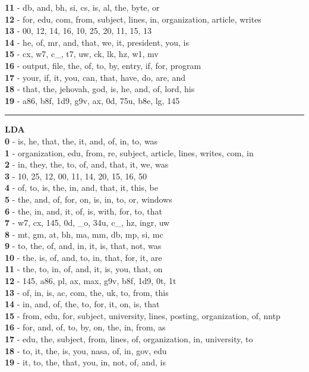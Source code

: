 \textbf{11} - db, and, bh, si, cs, is, al, the, byte, or\\
\textbf{12} - for, edu, com, from, subject, lines, in, organization, article, writes\\
\textbf{13} - 00, 12, 14, 16, 10, 25, 20, 11, 15, 13\\
\textbf{14} - he, of, mr, and, that, we, it, president, you, is\\
\textbf{15} - cx, w7, c\_, t7, uw, ck, lk, hz, w1, mv\\
\textbf{16} - output, file, the, of, to, by, entry, if, for, program\\
\textbf{17} - your, if, it, you, can, that, have, do, are, and\\
\textbf{18} - that, the, jehovah, god, is, he, and, of, lord, his\\
\textbf{19} - a86, b8f, 1d9, g9v, ax, 0d, 75u, b8e, lg, 145\\
\hrule\vspace{2mm}
\noindent
\textbf{LDA}\vspace{2mm}\\
\vspace{2mm}
\noindent
\textbf{0} - is, he, that, the, it, and, of, in, to, was\\
\textbf{1} - organization, edu, from, re, subject, article, lines, writes, com, in\\
\textbf{2} - in, they, the, to, of, and, that, it, we, was\\
\textbf{3} - 10, 25, 12, 00, 11, 14, 20, 15, 16, 50\\
\textbf{4} - of, to, is, the, in, and, that, it, this, be\\
\textbf{5} - the, and, of, for, on, is, in, to, or, windows\\
\textbf{6} - the, in, and, it, of, is, with, for, to, that\\
\textbf{7} - w7, cx, 145, 0d, \_o, 34u, c\_, hz, ingr, uw\\
\textbf{8} - mt, gm, at, bh, ma, mm, db, mp, si, mc\\
\textbf{9} - to, the, of, and, in, it, is, that, not, was\\
\textbf{10} - the, is, of, and, to, in, that, for, it, are\\
\textbf{11} - the, to, in, of, and, it, is, you, that, on\\
\textbf{12} - 145, a86, pl, ax, max, g9v, b8f, 1d9, 0t, 1t\\
\textbf{13} - of, in, is, ac, com, the, uk, to, from, this\\
\textbf{14} - in, and, of, the, to, for, it, on, is, that\\
\textbf{15} - from, edu, for, subject, university, lines, posting, organization, of, nntp\\
\textbf{16} - for, and, of, to, by, on, the, in, from, as\\
\textbf{17} - edu, the, subject, from, lines, of, organization, in, university, to\\
\textbf{18} - to, it, the, is, you, nasa, of, in, gov, edu\\
\textbf{19} - it, to, the, that, you, in, not, of, and, is\\